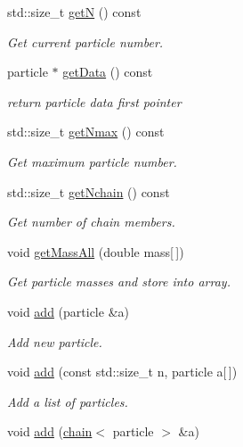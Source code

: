 \begin{DoxyCompactItemize}
std\+::size\+\_\+t \hyperlink{classARC_1_1chainlist_aeaeca2d5344e98007ea45c0332d765e0}{getN} () const 
\begin{DoxyCompactList}\small\item\em Get current particle number. \end{DoxyCompactList}\item 
particle $\ast$ \hyperlink{classARC_1_1chainlist_adf4f95d9135efc2f90381479f87ff5c6}{get\+Data} () const 
\begin{DoxyCompactList}\small\item\em return particle data first pointer \end{DoxyCompactList}\item 
std\+::size\+\_\+t \hyperlink{classARC_1_1chainlist_a09b34e47c6140de73287d98cc791da5f}{get\+Nmax} () const 
\begin{DoxyCompactList}\small\item\em Get maximum particle number. \end{DoxyCompactList}\item 
std\+::size\+\_\+t \hyperlink{classARC_1_1chainlist_ad330fb996670df4109c42e394d09d2aa}{get\+Nchain} () const 
\begin{DoxyCompactList}\small\item\em Get number of chain members. \end{DoxyCompactList}\item 
void \hyperlink{classARC_1_1chainlist_a5cf42b57b7088cf7418ae3d9f1b610fa}{get\+Mass\+All} (double mass\mbox{[}$\,$\mbox{]})
\begin{DoxyCompactList}\small\item\em Get particle masses and store into array. \end{DoxyCompactList}\item 
void \hyperlink{classARC_1_1chainlist_afa780edfa301cc22cf189e63d7a59c2c}{add} (particle \&a)
\begin{DoxyCompactList}\small\item\em Add new particle. \end{DoxyCompactList}\item 
void \hyperlink{classARC_1_1chainlist_a2dba82eb1c3caa32fc76b619c5379da5}{add} (const std\+::size\+\_\+t n, particle a\mbox{[}$\,$\mbox{]})
\begin{DoxyCompactList}\small\item\em Add a list of particles. \end{DoxyCompactList}\item 
void \hyperlink{classARC_1_1chainlist_a28fd6f0d4ba0ec36601dc92d340b2d2b}{add} (\hyperlink{classARC_1_1chain}{chain}$<$ particle $>$ \&a)

\end{DoxyCompactItemize}
